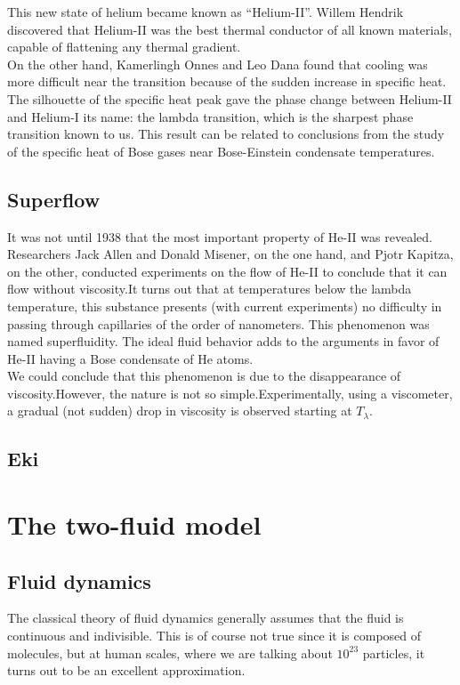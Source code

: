 \documentclass{article}
\begin{document}
This new state of helium became known as “Helium-II”. Willem Hendrik discovered that Helium-II was the best thermal conductor of all known materials, capable of flattening any thermal gradient. 
\\

On the other hand, Kamerlingh Onnes and Leo Dana found that cooling was more difficult near the transition because of the sudden increase in specific heat. The silhouette of the specific heat peak gave the phase change between Helium-II and Helium-I its name: the lambda transition, which is the sharpest phase transition known to us. This result can be related to conclusions from the study of the specific heat of Bose gases near Bose-Einstein condensate temperatures.
\\

\subsection{Superflow}

It was not until 1938 that the most important property of He-II was revealed.
Researchers Jack Allen and Donald Misener, on the one hand, and Pjotr Kapitza, on the other, conducted experiments on the flow of He-II to conclude that it can flow without viscosity.It turns out that at temperatures below the lambda temperature, this substance presents (with current experiments) no difficulty in passing through capillaries of the order of nanometers. This phenomenon was named superfluidity. The ideal fluid behavior adds to the arguments in favor of He-II having a Bose condensate of He atoms.
\\

We could conclude that this phenomenon is due to the disappearance of viscosity.However, the nature is not so simple.Experimentally, using a viscometer, a gradual (not sudden) drop in viscosity is observed starting at $T_\lambda$.
\\

\subsection{Eki}

\section{The two-fluid model}

\subsection{Fluid dynamics}
The classical theory of fluid dynamics generally assumes that the fluid is
continuous and indivisible.  This is of course not true since it is composed
of molecules, but at human scales, where we are talking about $10^{23}$
particles, it turns out to be an excellent approximation.
\\
\end{document}
